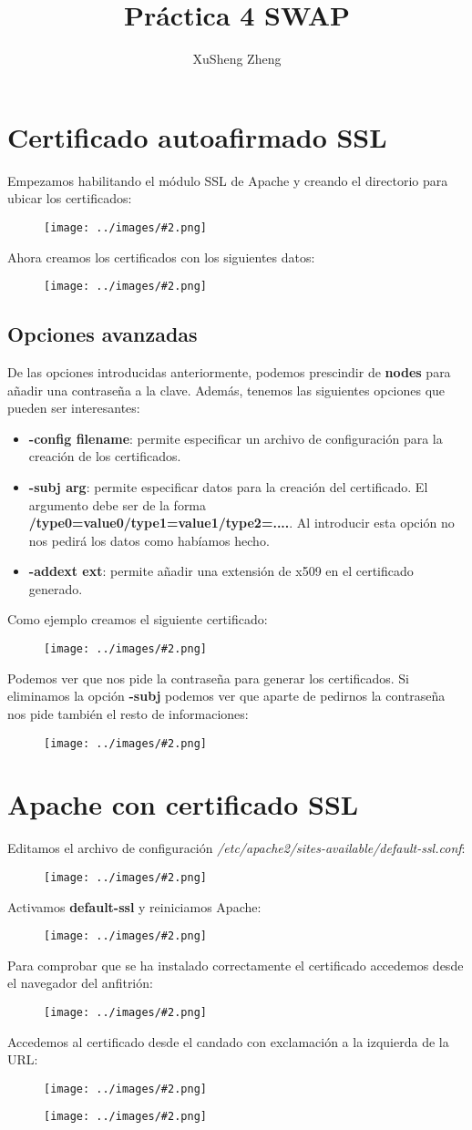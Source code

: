 \documentclass[twoside]{article}
\title{Práctica 4 SWAP}
\author{XuSheng Zheng}
\date{}
\newcommand{\image}[2]{
\begin{figure}[H]
    \texttt{[image: ../images/\#2.png]}
    \centering
\end{figure}
}
\begin{document}
\maketitle
\tableofcontents
\newpage

\section{Certificado autoafirmado SSL}
Empezamos habilitando el módulo SSL de Apache y creando el directorio para ubicar los certificados:
\image{8}{1}
Ahora creamos los certificados con los siguientes datos:
\image{8}{2}
\subsection{Opciones avanzadas}
De las opciones introducidas anteriormente, podemos prescindir de \textbf{nodes} para añadir una contraseña a la clave. Además, tenemos las siguientes opciones que pueden ser interesantes:
\begin{itemize}
    \item \textbf{-config filename}: permite especificar un archivo de configuración para la creación de los certificados.
    \item \textbf{-subj arg}: permite especificar datos para la creación del certificado. El argumento debe ser de la forma \textbf{/type0=value0/type1=value1/type2=....}. Al introducir esta opción no nos pedirá los datos como habíamos hecho.
    \item \textbf{-addext ext}: permite añadir una extensión de x509 en el certificado generado.
\end{itemize}
Como ejemplo creamos el siguiente certificado:
\image{8}{5}
Podemos ver que nos pide la contraseña para generar los certificados. Si eliminamos la opción \textbf{-subj} podemos ver que aparte de pedirnos la contraseña nos pide también el resto de informaciones:
\image{8}{6}

\section{Apache con certificado SSL}
Editamos el archivo de configuración \textit{/etc/apache2/sites-available/default-ssl.conf}:
\image{8}{3}
Activamos \textbf{default-ssl} y reiniciamos Apache:
\image{8}{4}
Para comprobar que se ha instalado correctamente el certificado accedemos desde el navegador del anfitrión:
\image{12}{8}
Accedemos al certificado desde el candado con exclamación a la izquierda de la URL:
\image{8}{9}
\image{12}{7}
\end{document}
